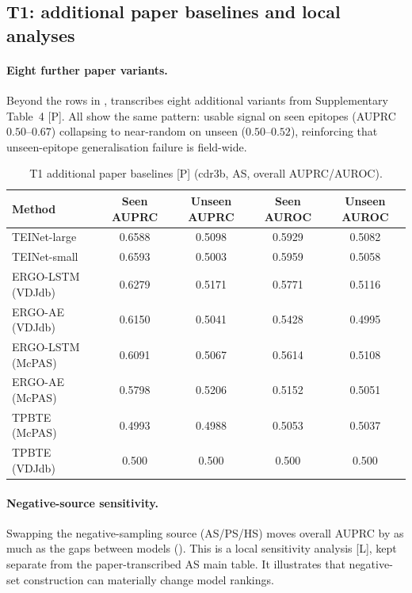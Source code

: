 \subsection{T1: additional paper baselines and local analyses}
\label{sec:t1-extra}

\paragraph{Eight further paper variants.} Beyond the rows in ,
 transcribes eight additional variants from Supplementary
Table~4 [P]. All show the same pattern: usable signal on seen epitopes
(AUPRC $0.50$--$0.67$) collapsing to near-random on unseen ($0.50$--$0.52$),
reinforcing that unseen-epitope generalisation failure is field-wide.

\begin{table}[h]
\centering
\caption{T1 additional paper baselines [P] (cdr3b, AS, overall AUPRC/AUROC).}
\label{tab:t1-tier1}
\small
\begin{tabular}{@{}lcccc@{}}
\toprule
Method & Seen AUPRC & Unseen AUPRC & Seen AUROC & Unseen AUROC \\
\midrule
TEINet-large     & 0.6588 & 0.5098 & 0.5929 & 0.5082 \\
TEINet-small     & 0.6593 & 0.5003 & 0.5959 & 0.5058 \\
ERGO-LSTM (VDJdb)& 0.6279 & 0.5171 & 0.5771 & 0.5116 \\
ERGO-AE (VDJdb)  & 0.6150 & 0.5041 & 0.5428 & 0.4995 \\
ERGO-LSTM (McPAS)& 0.6091 & 0.5067 & 0.5614 & 0.5108 \\
ERGO-AE (McPAS)  & 0.5798 & 0.5206 & 0.5152 & 0.5051 \\
TPBTE (McPAS)    & 0.4993 & 0.4988 & 0.5053 & 0.5037 \\
TPBTE (VDJdb)    & 0.500 & 0.500 & 0.500 & 0.500 \\
\bottomrule
\end{tabular}
\end{table}

\paragraph{Negative-source sensitivity.} Swapping the negative-sampling source
(AS/PS/HS) moves overall AUPRC by as much as the gaps between models
(). This is a local sensitivity analysis [L], kept separate
from the paper-transcribed AS main table. It illustrates that negative-set
construction can materially change model rankings.

